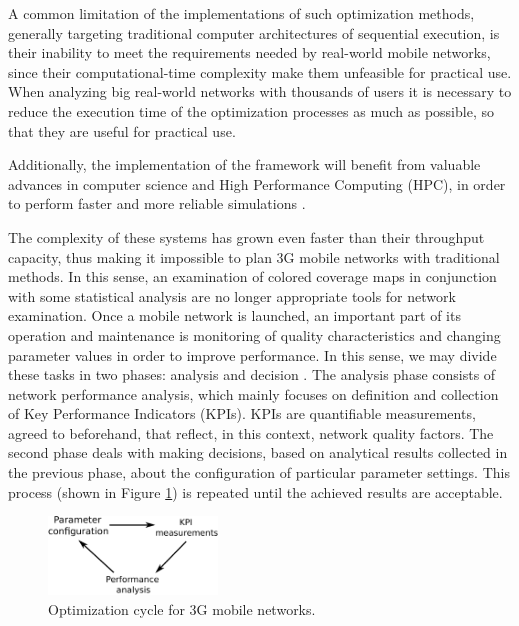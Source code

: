 A common limitation of the implementations of such optimization methods,
generally targeting traditional computer architectures of sequential
execution, is their inability to meet the requirements needed by real-world
mobile networks, since their computational-time complexity make them
unfeasible for practical use. When analyzing big real-world networks
with thousands of users it is necessary to reduce the execution time
of the optimization processes as much as possible, so that they are
useful for practical use.

Additionally, the implementation of the framework will benefit from
valuable advances in computer science and High Performance Computing
(HPC), in order to perform faster and more reliable simulations \cite{gorder2007multicore,wen2011gpu}.

The complexity of these systems has grown even faster than their throughput
capacity, thus making it impossible to plan 3G mobile networks with
traditional methods. In this sense, an examination of colored coverage
maps in conjunction with some statistical analysis are no longer appropriate
tools for network examination. Once a mobile network is launched,
an important part of its operation and maintenance is monitoring of
quality characteristics and changing parameter values in order to
improve performance. In this sense, we may divide these tasks in two
phases: analysis and decision \cite{nawrocki2006understanding}. The
analysis phase consists of network performance analysis, which mainly
focuses on definition and collection of Key Performance Indicators
(KPIs). KPIs are quantifiable measurements, agreed to beforehand,
that reflect, in this context, network quality factors. The second
phase deals with making decisions, based on analytical results collected
in the previous phase, about the configuration of particular parameter
settings. This process (shown in Figure \ref{fig:Optimization-cycle})
is repeated until the achieved results are acceptable.

\begin{figure}
\centering

\includegraphics[width=0.4\textwidth]{02-background_and_motivation/img/optimization_cycle}

\caption{Optimization cycle for 3G mobile networks.\label{fig:Optimization-cycle}}
\end{figure}


